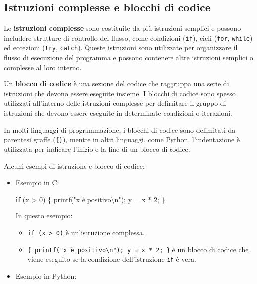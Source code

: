\documentclass[
  letterpaper,
]{scrbook}
\newenvironment{Shaded}{\begin{snugshade}}{\end{snugshade}}
\newcommand{\ControlFlowTok}[1]{\textcolor[rgb]{0.00,0.23,0.31}{\textbf{#1}}}
\newcommand{\DecValTok}[1]{\textcolor[rgb]{0.68,0.00,0.00}{#1}}
\newcommand{\NormalTok}[1]{\textcolor[rgb]{0.00,0.23,0.31}{#1}}
\newcommand{\OperatorTok}[1]{\textcolor[rgb]{0.37,0.37,0.37}{#1}}
\newcommand{\SpecialCharTok}[1]{\textcolor[rgb]{0.37,0.37,0.37}{#1}}
\newcommand{\StringTok}[1]{\textcolor[rgb]{0.13,0.47,0.30}{#1}}
\providecommand{\tightlist}{%
  \setlength{\itemsep}{0pt}\setlength{\parskip}{0pt}}\usepackage{longtable,booktabs,array}
\begin{document}
\subsection{Istruzioni complesse e blocchi di
codice}\label{istruzioni-complesse-e-blocchi-di-codice}

Le \textbf{istruzioni complesse} sono costituite da più istruzioni
semplici e possono includere strutture di controllo del flusso, come
condizioni (\texttt{if}), cicli (\texttt{for}, \texttt{while}) ed
eccezioni (\texttt{try}, \texttt{catch}). Queste istruzioni sono
utilizzate per organizzare il flusso di esecuzione del programma e
possono contenere altre istruzioni semplici o complesse al loro interno.

Un \textbf{blocco di codice} è una sezione del codice che raggruppa una
serie di istruzioni che devono essere eseguite insieme. I blocchi di
codice sono spesso utilizzati all'interno delle istruzioni complesse per
delimitare il gruppo di istruzioni che devono essere eseguite in
determinate condizioni o iterazioni.

In molti linguaggi di programmazione, i blocchi di codice sono
delimitati da parentesi graffe (\texttt{\{\}}), mentre in altri
linguaggi, come Python, l'indentazione è utilizzata per indicare
l'inizio e la fine di un blocco di codice.

Alcuni esempi di istruzione e blocco di codice:

\begin{itemize}
\item
  Esempio in C:

\begin{Shaded}
\begin{Highlighting}[]
\ControlFlowTok{if} \OperatorTok{(}\NormalTok{x }\OperatorTok{\textgreater{}} \DecValTok{0}\OperatorTok{)} \OperatorTok{\{}
\NormalTok{    printf}\OperatorTok{(}\StringTok{"x è positivo}\SpecialCharTok{\textbackslash{}n}\StringTok{"}\OperatorTok{);}
\NormalTok{    y }\OperatorTok{=}\NormalTok{ x }\OperatorTok{*} \DecValTok{2}\OperatorTok{;}
\OperatorTok{\}}
\end{Highlighting}
\end{Shaded}

  In questo esempio:

  \begin{itemize}
  \tightlist
  \item
    \texttt{if\ (x\ \textgreater{}\ 0)} è un'istruzione complessa.
  \item
    \texttt{\{\ printf("x\ è\ positivo\textbackslash{}n");\ y\ =\ x\ *\ 2;\ \}}
    è un blocco di codice che viene eseguito se la condizione
    dell'istruzione \texttt{if} è vera.
  \end{itemize}
\item
  Esempio in Python:
\end{itemize}
\end{document}
